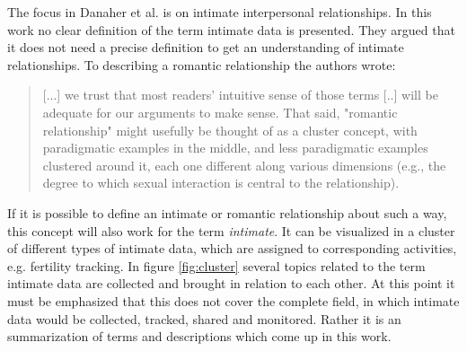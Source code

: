 The focus in Danaher et al. \cite{doi:10.1080/15265161.2017.1409823} is on intimate interpersonal relationships. In this work no clear definition of the term intimate data is presented. They argued that it does not need a precise definition to get an understanding of intimate relationships. To describing a romantic relationship the authors wrote:

\begin{quote}
	[...] we trust that most readers' intuitive sense of those terms [..] will be adequate for our arguments to make sense. That said, "romantic relationship" might usefully be thought of as a cluster concept, with paradigmatic examples in the middle, and less paradigmatic examples clustered around it, each one different along various dimensions (e.g., the degree to which sexual interaction is central to the relationship).
\end{quote}

If it is possible to define an intimate or romantic relationship about such a way, this concept will also work for the term \textit{intimate}. 
It can be visualized in a cluster of different types of intimate data, which are assigned to corresponding activities, e.g. fertility tracking.
In figure \ref{fig:cluster} several topics related to the term intimate data are collected and brought in relation to each other. At this point it must be emphasized that this does not cover the complete field, in which intimate data would be collected, tracked, shared and monitored. Rather it is an summarization of terms and descriptions which come up in this work.



